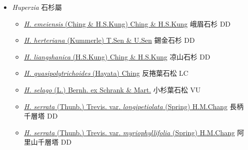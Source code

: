 
  \begin{itemize}
 \item[] \textit{Huperzia} 石杉屬
                    
  \begin{itemize}
        \item[] \href{http://www.theplantlist.org/tpl1.1/search?q=Huperzia+emeiensis}{\textit{H. emeiensis} (Ching \& H.S.Kung) Ching \& H.S.Kung}   峨眉石杉 DD
        \item[] \href{http://www.theplantlist.org/tpl1.1/search?q=Huperzia+herteriana}{\textit{H. herteriana} (Kummerle) T.Sen \& U.Sen}   錫金石杉 DD
        \item[] \href{http://www.theplantlist.org/tpl1.1/search?q=Huperzia+liangshanica}{\textit{H. liangshanica} (H.S.Kung) Ching \& H.S.Kung}   凉山石杉 DD
        \item[] \href{http://www.theplantlist.org/tpl1.1/search?q=Huperzia+quasipolytrichoides}{\textit{H. quasipolytrichoides} (Hayata) Ching}     反捲葉石松 LC
        \item[] \href{http://www.theplantlist.org/tpl1.1/search?q=Huperzia+selago}{\textit{H. selago} (L.) Bernh. ex Schrank \& Mart.}     小杉葉石松 VU
        \item[] \href{http://www.theplantlist.org/tpl1.1/search?q=Huperzia+serrata+var.+longipetiolata}{\textit{H. serrata} (Thunb.) Trevis. var. \textit{longipetiolata} (Spring) H.M.Chang}   長柄千層塔 DD
        \item[] \href{http://www.theplantlist.org/tpl1.1/search?q=Huperzia+serrata+var.+myriophyllifolia}{\textit{H. serrata} (Thunb.) Trevis. var. \textit{myriophyllifolia} (Spring) H.M.Chang}   阿里山千層塔 DD

\end{itemize}
\end{itemize}
